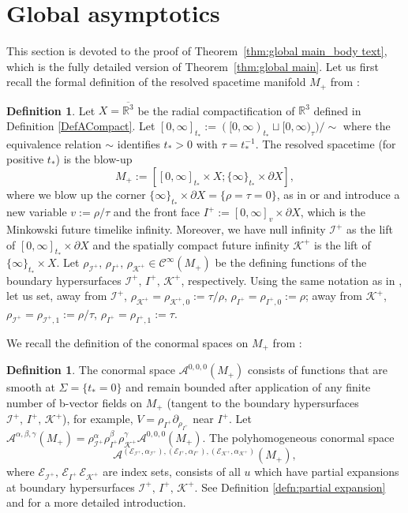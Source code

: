 \documentclass[10pt,a4paper,reqno]{amsart}
\newcommand{\CI}{\mathcal{C}^\infty}
\newcommand{\RR}{\mathbb{R}}
\newcommand{\A}{\mathcal{A}}
\theoremstyle{definition}
\newtheorem{definition}[theorem]{Definition}
\theoremstyle{remark}
\numberwithin{equation}{section}
\newcommand{\cE}{\mathcal E}
\newcommand{\ts}{t_*}
\begin{document}
\section{Global asymptotics}
\label{sec:global asymp}
This section is devoted to the proof of Theorem~\ref{thm:global main_body text}, which is the fully detailed version of Theorem~\ref{thm:global main}. Let us first recall the formal definition of the resolved spacetime manifold $M_+$ from \cite[Definition 3.7]{Hin22}:
\begin{definition}
\label{def:M+}
Let $X=\overline{\RR^3}$ be the radial compactification of $\RR^3$ defined in Definition \ref{DefACompact}. Let $[0,\infty]_{\ts} := ([0,\infty)_{\ts}\sqcup [0,\infty)_\tau)/\sim$ where the equivalence relation $\sim$ identifies $\ts>0$ with $\tau=\ts^{-1}$. The resolved spacetime (for positive $\ts$) is the blow-up
\[
    M_+ := [[0,\infty]_{\ts}\times X ; \{\infty\}_{\ts}\times\partial X],
\]
where we blow up the corner $\{\infty\}_{\ts}\times\partial X = \{\rho=\tau=0\}$, as in \cite[Definition 3.7]{Hin22} or \cite[Definition 2.12]{Hin22} and introduce a new variable $v:=\rho/\tau$ and the front face $I^+ := [0,\infty]_v \times\partial X$, which is the Minkowski future timelike infinity. Moreover, we have null infinity $\mathscr{I}^+$ as the lift of $[0,\infty]_{\ts}\times\partial X$ and the spatially compact future infinity $\mathcal{K}^+$ is the lift of $\{\infty\}_{\ts}\times X$. Let $\rho_{\mathscr{I}^+},\,\rho_{I^+},\,\rho_{\mathcal{K}^+} \in \CI(M_+)$ be the defining functions of the boundary hypersurfaces $\mathscr{I}^+,\,I^+,\,\mathcal{K}^+$, respectively. Using the same notation as in \cite[Definition 3.7]{Hin22}, let us set, away from $\mathscr{I}^+$, $\rho_{\mathcal{K}^+} = \rho_{\mathcal{K}^+,0} := \tau/\rho$, $\rho_{I^+} = \rho_{I^+,0} := \rho$; away from $\mathcal{K}^+$, $\rho_{\mathscr{I}^+} = \rho_{\mathscr{I}^+,1} := \rho/\tau$, $\rho_{{I}^+} = \rho_{{I}^+,1} := \tau$.
\end{definition}

\noindent
We recall the definition of the conormal spaces on $M_+$ from \cite[Definition 3.8]{Hin22}:
\begin{definition}
\label{def:conormal on M+}
The conormal space $\A^{0,0,0}(M_+)$ consists of functions that are smooth at $\Sigma=\{\ts=0\}$ and remain bounded after application of any finite number of b-vector fields on $M_+$ (tangent to the boundary hypersurfaces $\mathscr{I}^+,\,I^+,\,\mathcal{K}^+$), for example, $V=\rho_{{I}^+}\partial_{\rho_{{I}^+}}$ near $I^+$. Let $\A^{\alpha, \beta, \gamma}(M_+) = \rho_{\mathscr{I}^+}^\alpha \rho_{I^+}^\beta \rho_{\mathcal{K}^+}^\gamma \A^{0,0,0}(M_+)$. The polyhomogeneous conormal space 
\[
\A^{(\cE_{\mathscr{I}^+},\alpha_{\mathscr{I}^+}),(\cE_{{I}^+},\alpha_{{I}^+}), (\cE_{\mathcal{K}^+},\alpha_{\mathcal{K}^+})} (M_+),
\]
where $\cE_{\mathscr{I}^+},\,\cE_{{I}^+}\, \cE_{\mathcal{K}^+}$ are index sets, consists of all $u$ which have partial expansions at boundary hypersurfaces ${\mathscr{I}^+},\,{{I}^+},\,{\mathcal{K}^+}$. See Definition \ref{defn:partial expansion} and \cite[Definition 2.13]{Hin22} for a more detailed introduction.
\end{definition}
\end{document}
